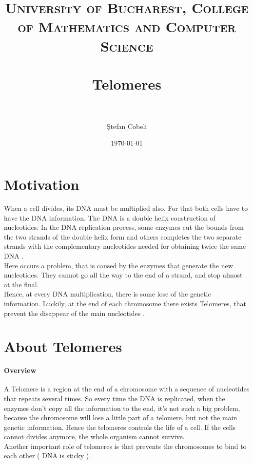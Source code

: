 \documentclass[paper=a4, fontsize=11pt]{scrartcl} %
\title{	
\normalfont \normalsize 
\textsc{University of Bucharest, College of Mathematics and Computer Science  } \\ [25pt] %
\horrule{0.5pt} \\[0.4cm] %
\huge Telomeres \\ %
\horrule{2pt} \\[0.5cm] %
}
\author{\c Stefan Cobeli} %
\date{\normalsize\today} %
\numberwithin{equation}{section} %
\numberwithin{figure}{section} %
\numberwithin{table}{section} %
\begin{document}
\maketitle %


\section{Motivation}

\lipsum[200]  %

\paragraph{}
When a cell divides, its DNA must be multiplied also. For that both cells have to have  the DNA information. 
The DNA is a double helix construction of nucleotides. In the DNA replication process, some enzymes cut the bounds from the two strands of the double helix form and others completes the two separate strands with the complementary nucleotides needed for obtaining twice the same DNA .\\
Here occurs a problem, that is caused by the enzymes that generate the new nucleotides. They cannot go all the way to the end of a strand, and stop almost at the final. \\
Hence, at every DNA multiplication, there is some lose of the genetic information.
Luckily, at the end of each chromosome there exists Telomeres, that prevent the disappear of the main nucleotides .


\section{ About Telomeres  }
\paragraph{Overview }

A Telomere is a region at the end of a chromosome with a sequence of nucleotides that repeats several times. 
So every time the DNA is replicated, when the enzymes don't copy all the information to the end, it's not such a big problem, because the chromosome will lose a little part of a telomere, but not the main genetic information.
Hence the telomeres controls the life of a cell. If the cells cannot divides anymore, the whole organism cannot survive.\\
Another important role of telomeres is that prevents the chromosomes to bind to each other ( DNA is sticky  ).
\end{document}
